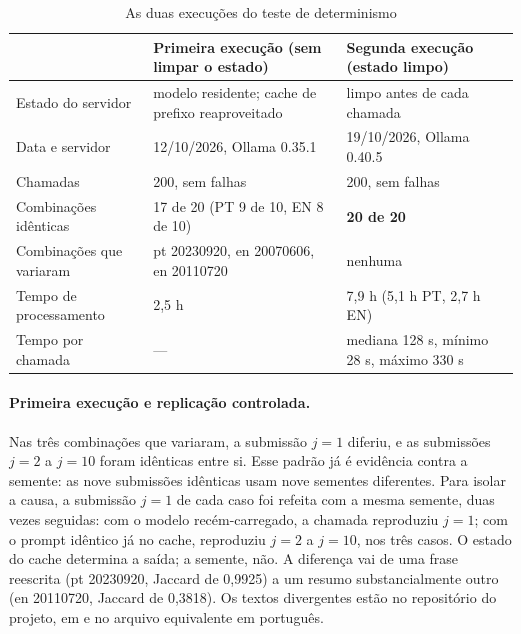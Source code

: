 \documentclass[12pt]{article}
\begin{document}
\begin{table}[ht]
\centering
\caption{As duas execuções do teste de determinismo}
\label{tab:det_execucoes}
\begin{tabularx}{\linewidth}{|>{\raggedright\arraybackslash}p{3.4cm}|Y|Y|}
\hline
 & \textbf{Primeira execução (sem limpar o estado)} &
\textbf{Segunda execução (estado limpo)} \\
\hline
Estado do servidor & modelo residente; cache de prefixo reaproveitado & limpo
antes de cada chamada \\
\hline
Data e servidor & 12/10/2026, Ollama 0.35.1 & 19/10/2026, Ollama 0.40.5 \\
\hline
Chamadas & 200, sem falhas & 200, sem falhas \\
\hline
Combinações idênticas & 17 de 20 (PT 9 de 10, EN 8 de 10) & \textbf{20 de 20} \\
\hline
Combinações que variaram & pt 20230920, en 20070606, en 20110720 & nenhuma \\
\hline
Tempo de processamento & 2,5 h & 7,9 h (5,1 h PT, 2,7 h EN) \\
\hline
Tempo por chamada & --- & mediana 128 s, mínimo 28 s, máximo 330 s \\
\hline
\end{tabularx}
\end{table}

\paragraph{Primeira execução e replicação controlada.} Nas três combinações que
variaram, a submissão $j = 1$ diferiu, e as submissões $j = 2$ a $j = 10$ foram
idênticas entre si. Esse padrão já é evidência contra a semente: as nove
submissões idênticas usam nove sementes diferentes. Para isolar a causa, a
submissão $j = 1$ de cada caso foi refeita com a mesma semente, duas vezes
seguidas: com o modelo recém-carregado, a chamada reproduziu $j = 1$; com o
prompt idêntico já no cache, reproduziu $j = 2$ a $j = 10$, nos três casos. O
estado do cache determina a saída; a semente, não. A diferença vai de uma frase
reescrita (pt 20230920, Jaccard de 0,9925) a um resumo substancialmente outro
(en 20110720, Jaccard de 0,3818). Os textos divergentes estão no repositório do
projeto, em  e no
arquivo equivalente em português.
\end{document}
